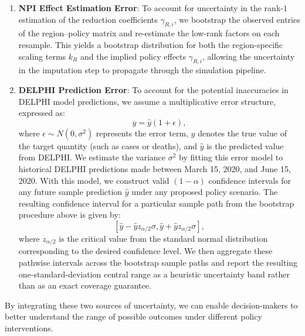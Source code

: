 \documentclass[msom,blindrev]{informs3} %
\newcommand{\rev}[1]{{\color{blue}#1}}
\begin{document}
\begin{enumerate}
    \item \textbf{NPI Effect Estimation Error}: \rev{To account for uncertainty in the rank-$1$ estimation of the reduction coefficients $\gamma_{R,i}$, we bootstrap the observed entries of the region--policy matrix and re-estimate the low-rank factors on each resample. This yields a bootstrap distribution for both the region-specific scaling terms $k_R$ and the implied policy effects $\gamma_{R,i}$, allowing the uncertainty in the imputation step to propagate through the simulation pipeline.}

    \item \textbf{DELPHI Prediction Error}: To account for the potential inaccuracies in DELPHI model predictions, we assume a multiplicative error structure, expressed as:
    \[
    y = \hat{y}(1 + \epsilon),
    \]
    where $\epsilon \sim N(0, \sigma^2)$ represents the error term, $y$ denotes the true value of the target quantity (such as cases or deaths), and $\hat{y}$ is the predicted value from DELPHI. We estimate the variance $\sigma^2$ by fitting this error model to historical DELPHI predictions made between March 15, 2020, and June 15, 2020. With this model, we construct valid $(1-\alpha)$ confidence intervals for any future sample prediction $\hat{y}$ under any proposed policy scenario. The resulting confidence interval for a particular sample path from the bootstrap procedure above is given by:
    \[
    [\hat{y} - \hat{y}z_{\alpha/2}\sigma, \hat{y} + \hat{y}z_{\alpha/2}\sigma],
    \]
    where $z_{\alpha/2}$ is the critical value from the standard normal distribution corresponding to the desired confidence level.  \rev{We then aggregate these pathwise intervals across the bootstrap sample paths and report the resulting one-standard-deviation central range as a heuristic uncertainty band rather than as an exact coverage guarantee.}
\end{enumerate}
By integrating these two sources of uncertainty, we can enable decision-makers to better understand the range of possible outcomes under different policy interventions.
\end{document}
